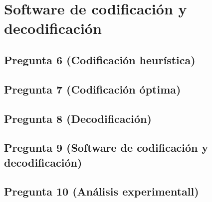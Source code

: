 \section{Software de codificación y decodificación}

\subsection{Pregunta 6 (Codificación heurística)}
\subsection{Pregunta 7 (Codificación óptima)}
\subsection{Pregunta 8 (Decodificación)}
\subsection{Pregunta 9 (Software de codificación y decodificación)}
\subsection{Pregunta 10 (Análisis experimentall)}
